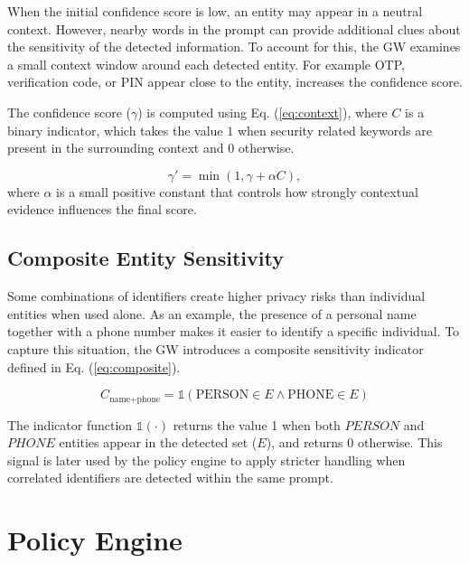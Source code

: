 \documentclass[conference]{IEEEtran}
\begin{document}
When the initial confidence score is low, an entity may appear in a neutral context. However, nearby words in the prompt can provide additional clues about the sensitivity of the detected information. To account for this, the GW examines a small context window around each detected entity. For example OTP, verification code, or PIN appear close to the entity, increases the confidence score.

The confidence score ($\gamma$) is computed using Eq. (\ref{eq:context}), where $C$ is a binary indicator, which takes the value $1$ when security related keywords are present in the surrounding context and $0$ otherwise. %

\begin{equation}
\gamma' = \min(1, \gamma + \alpha C),
\label{eq:context}
\end{equation}
where $\alpha$ is a small positive constant that controls how strongly contextual evidence influences the final score. %

\subsection{Composite Entity Sensitivity}

Some combinations of identifiers create higher privacy risks than individual entities when used alone. As an example, the presence of a personal name together with a phone number makes it easier to identify a specific individual. To capture this situation, the GW introduces a composite sensitivity indicator defined in Eq. (\ref{eq:composite}).

\begin{equation}
C_{\text{name+phone}} =
\mathbb{1}(\text{PERSON} \in E \land \text{PHONE} \in E)
\label{eq:composite}
\end{equation}

The indicator function $\mathbb{1}(\cdot)$ returns the value 1 when both $PERSON$ and $PHONE$ entities appear in the detected set ($E$), and returns $0$ otherwise. This signal is later used by the policy engine to apply stricter handling when correlated identifiers are detected within the same prompt.

\section{Policy Engine}
\label{sec:policy}
\end{document}
